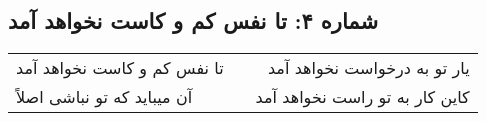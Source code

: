 \begin{center}
\section*{شماره ۴: تا نفس کم و کاست نخواهد آمد}
\label{sec:004}
\begin{longtable}{l p{0.5cm} r}
تا نفس کم و کاست نخواهد آمد
&&
یار تو به درخواست نخواهد آمد
\\
آن میباید که تو نباشی اصلاً
&&
کاین کار به تو راست نخواهد آمد
\\
\end{longtable}
\end{center}
